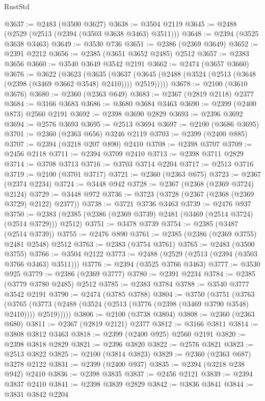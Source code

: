 \begin{lexlean}{RustStd}
\begin{coremodule}
@3637 := @2483 (@3500 @3627)
@3638 := @3504 @2119
@3645 := @2488 (@2529 (@2513 (@2394 (@3503 @3638 @3463) @3511)))
@3648 := @2394 (@3525 @3638 @3463)
@3649 := @3530 @736
@3651 := @2386 (@2369 @3649)
@3652 := @2391 @2212
@3656 := @2385 (@3651 @3652 @2485) @2512
@3657 := @2383 @3656
@3660 := @3540 @3649 @3542 @2191
@3662 := @2474 (@3657 @3660)
@3676 := @3622
    (@3623
      (@3635
        (@3637 (@3645 (@2488 (@3524 (@2513 (@3648 (@2398 (@3469 @3662 @3548) @2410)))) @2519)))))
@3678 := @2100 (@3610 @3676)
@3680 := @2360 (@2363 @649)
@3683 := @2367 (@2819 @2118) @2377
@3684 := @3166 @3683
@3686 := @3680 @3684 @3463
@3690 := @2399 (@2400 @873) @2560 @2191
@3692 := @2398 @3690 @2829
@3693 := @2396 @3692
@3694 := @2576 @3693
@3695 := @2513 @3694
@3697 := @2100 (@3686 @3695)
@3701 := @2360 (@2363 @656) @3246 @2119
@3703 := @2399 (@2400 @885)
@3707 := @2394 (@3218 @207 @890) @2410
@3708 := @2398 @3707
@3709 := @2456 @2118
@3711 := @2394 @3709 @2410
@3713 := @2398 @3711 @2829
@3714 := @3708 @3713
@3716 := @3703 @3714 @2204
@3717 := @2513 @3716
@3719 := @2100 (@3701 @3717)
@3721 := @2360 (@2363 @675)
@3723 := @2367 (@2374 @2234)
@3724 := @3448 @942
@3728 := @2367 (@2368 (@2369 @3724) @2124)
@3729 := @3448 @972
@3736 := @3723 (@3728 (@2367 (@2368 (@2369 @3729) @2122) @2377))
@3738 := @3721 @3736 @3463
@3739 := @2476 @937
@3750 := @2383 (@2385 (@2386 (@2369 @3739) @2481 (@3469 (@2514 @3724) (@2514 @3729))) @2512)
@3751 := @3478 @3739
@3754 := @2385 (@3487 (@2514 @3739))
@3755 := @2476 @890
@3761 := @2385 (@2386 (@2369 @3755) @2481 @2548) @2512
@3763 := @2383 (@3754 @3761)
@3765 := @2483 (@3500 @3755)
@3766 := @3504 @2122
@3773 := @2488 (@2529 (@2513 (@2394 (@3503 @3766 @3463) @3511)))
@3776 := @2394 (@3525 @3766 @3463)
@3777 := @3530 @925
@3779 := @2386 (@2369 @3777)
@3780 := @2391 @2234
@3784 := @2385 (@3779 @3780 @2485) @2512
@3785 := @2383 @3784
@3788 := @3540 @3777 @3542 @2191
@3790 := @2474 (@3785 @3788)
@3804 := @3750
    (@3751
      (@3763
        (@3765 (@3773 (@2488 (@3524 (@2513 (@3776 (@2398 (@3469 @3790 @3548) @2410)))) @2519)))))
@3806 := @2100 (@3738 @3804)
@3808 := @2360 (@2363 @680)
@3811 := @2367 (@2819 @2121) @2377
@3812 := @3166 @3811
@3814 := @3808 @3812 @3463
@3818 := @2399 (@2400 @925) @2560 @2191
@3820 := @2398 @3818 @2829
@3821 := @2396 @3820
@3822 := @2576 @3821
@3823 := @2513 @3822
@3825 := @2100 (@3814 @3823)
@3829 := @2360 (@2363 @687) @3278 @2122
@3831 := @2399 (@2400 @937)
@3835 := @2394 (@3218 @238 @942) @2410
@3836 := @2398 @3835
@3837 := @2456 @2121
@3839 := @2394 @3837 @2410
@3841 := @2398 @3839 @2829
@3842 := @3836 @3841
@3844 := @3831 @3842 @2204

\end{coremodule}
\end{lexlean}
